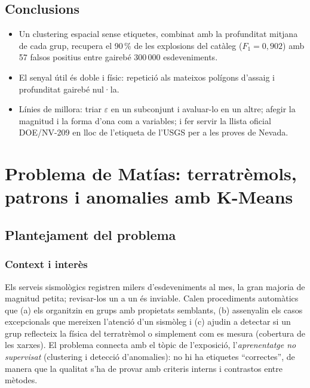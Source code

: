 \documentclass[a4paper,11pt]{article}
\begin{document}
\subsection{Conclusions}
\begin{itemize}
  \item Un clustering espacial sense etiquetes, combinat amb la profunditat mitjana de cada grup, recupera el 90\,\% de les explosions del catàleg ($F_1=0{,}902$) amb 57 falsos positius entre gairebé 300\,000 esdeveniments.
  \item El senyal útil és doble i físic: repetició als mateixos polígons d'assaig i profunditat gairebé nul·la.
  \item Línies de millora: triar $\varepsilon$ en un subconjunt i avaluar-lo en un altre; afegir la magnitud i la forma d'ona
        com a variables; i fer servir la llista oficial DOE/NV-209 \cite{doe2015} en lloc de l'etiqueta de l'USGS per a les
        proves de Nevada.
\end{itemize}

\clearpage
\section{Problema de Matías: terratrèmols, patrons i anomalies amb K-Means}
\label{sec:matias_sismes}

\subsection{Plantejament del problema}
\subsubsection{Context i interès}
Els serveis sismològics registren milers d'esdeveniments al mes, la gran majoria de magnitud petita; revisar-los un a un és inviable. Calen procediments automàtics que (a) els organitzin en grups amb propietats semblants, (b) assenyalin els casos excepcionals que mereixen l'atenció d'un sismòleg i (c) ajudin a detectar si un grup reflecteix la física del terratrèmol o simplement com es mesura (cobertura de les xarxes). El problema connecta amb el tòpic de l'exposició, l'\emph{aprenentatge no supervisat} (clustering i detecció d'anomalies): no hi ha etiquetes ``correctes'', de manera que la qualitat s'ha de provar amb criteris interns i contrastos entre mètodes.
\end{document}
